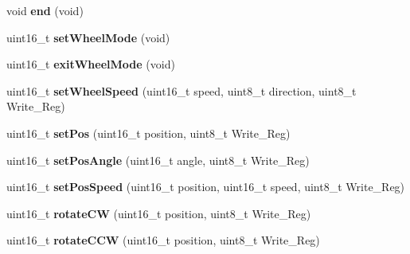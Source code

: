 \begin{DoxyCompactItemize}
\item 
void {\bfseries end} (void)\hypertarget{classCytron__G15__Servo_a166e9fd15c06a01d9ba4f19c9dfc6cbe}{}\label{classCytron__G15__Servo_a166e9fd15c06a01d9ba4f19c9dfc6cbe}

\item 
uint16\+\_\+t {\bfseries set\+Wheel\+Mode} (void)\hypertarget{classCytron__G15__Servo_aac2cca8b10b06b39dd8e09789ddee2db}{}\label{classCytron__G15__Servo_aac2cca8b10b06b39dd8e09789ddee2db}

\item 
uint16\+\_\+t {\bfseries exit\+Wheel\+Mode} (void)\hypertarget{classCytron__G15__Servo_a0da8b54cddbb1cbebad151ed38ec6f96}{}\label{classCytron__G15__Servo_a0da8b54cddbb1cbebad151ed38ec6f96}

\item 
uint16\+\_\+t {\bfseries set\+Wheel\+Speed} (uint16\+\_\+t speed, uint8\+\_\+t direction, uint8\+\_\+t Write\+\_\+\+Reg)\hypertarget{classCytron__G15__Servo_ab2d3a2e8dbc5efe8b930775990f40bfd}{}\label{classCytron__G15__Servo_ab2d3a2e8dbc5efe8b930775990f40bfd}

\item 
uint16\+\_\+t {\bfseries set\+Pos} (uint16\+\_\+t position, uint8\+\_\+t Write\+\_\+\+Reg)\hypertarget{classCytron__G15__Servo_a633d9d0be69a5b322009064b3476a87a}{}\label{classCytron__G15__Servo_a633d9d0be69a5b322009064b3476a87a}

\item 
uint16\+\_\+t {\bfseries set\+Pos\+Angle} (uint16\+\_\+t angle, uint8\+\_\+t Write\+\_\+\+Reg)\hypertarget{classCytron__G15__Servo_afd809206836a6576d14285cee4b35909}{}\label{classCytron__G15__Servo_afd809206836a6576d14285cee4b35909}

\item 
uint16\+\_\+t {\bfseries set\+Pos\+Speed} (uint16\+\_\+t position, uint16\+\_\+t speed, uint8\+\_\+t Write\+\_\+\+Reg)\hypertarget{classCytron__G15__Servo_a9322538f893c36ffad19b5595c9e3604}{}\label{classCytron__G15__Servo_a9322538f893c36ffad19b5595c9e3604}

\item 
uint16\+\_\+t {\bfseries rotate\+CW} (uint16\+\_\+t position, uint8\+\_\+t Write\+\_\+\+Reg)\hypertarget{classCytron__G15__Servo_a98b3da2bc4e6db55600fa8d2d78e2391}{}\label{classCytron__G15__Servo_a98b3da2bc4e6db55600fa8d2d78e2391}

\item 
uint16\+\_\+t {\bfseries rotate\+C\+CW} (uint16\+\_\+t position, uint8\+\_\+t Write\+\_\+\+Reg)\hypertarget{classCytron__G15__Servo_a29861c1d16fb4be69578f75dace85354}{}\label{classCytron__G15__Servo_a29861c1d16fb4be69578f75dace85354}


\end{DoxyCompactItemize}
